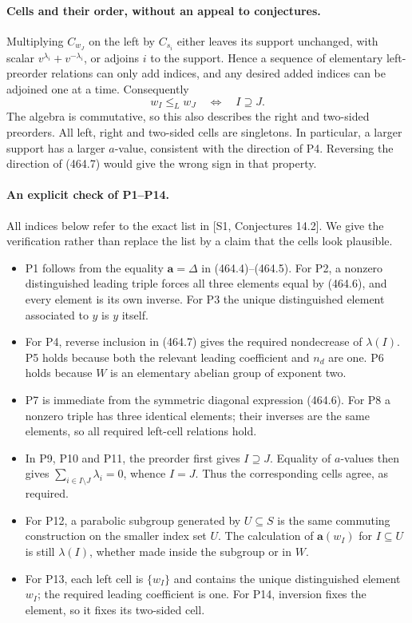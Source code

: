 \documentclass[11pt]{article}
\begin{document}
\paragraph{Cells and their order, without an appeal to conjectures.}
Multiplying $C_{w_J}$ on the left by $C_{s_i}$ either leaves its support
unchanged, with scalar $v^{\lambda_i}+v^{-\lambda_i}$, or adjoins
$i$ to the support. Hence a sequence of elementary left-preorder
relations can only add indices, and any desired added indices can
be adjoined one at a time. Consequently
\[
 w_I\leq_L w_J\quad\Longleftrightarrow\quad I\supseteq J.
 \tag{464.7}
\]
The algebra is commutative, so this also describes the right and
two-sided preorders. All left, right and two-sided cells are singletons.
In particular, a larger support has a larger $a$-value, consistent
with the direction of P4. Reversing the direction of (464.7) would
give the wrong sign in that property.

\paragraph{An explicit check of P1--P14.}
All indices below refer to the exact list in [S1, Conjectures 14.2].
We give the verification rather than replace the list by a claim that
the cells look plausible.

\begin{itemize}
\item P1 follows from the equality $\mathbf a=\Delta$ in (464.4)--(464.5).
For P2, a nonzero distinguished leading triple forces all three
elements equal by (464.6), and every element is its own inverse.
For P3 the unique distinguished element associated to $y$ is $y$ itself.
\item For P4, reverse inclusion in (464.7) gives the required
nondecrease of $\lambda(I)$. P5 holds because both the relevant
leading coefficient and $n_d$ are one. P6 holds because $W$ is an
elementary abelian group of exponent two.
\item P7 is immediate from the symmetric diagonal expression (464.6).
For P8 a nonzero triple has three identical elements; their inverses
are the same elements, so all required left-cell relations hold.
\item In P9, P10 and P11, the preorder first gives $I\supseteq J$.
Equality of $a$-values then gives
$\sum_{i\in I\setminus J}\lambda_i=0$, whence $I=J$.
Thus the corresponding cells agree, as required.
\item For P12, a parabolic subgroup generated by $U\subseteq S$
is the same commuting construction on the smaller index set $U$.
The calculation of $\mathbf a(w_I)$ for $I\subseteq U$ is still
$\lambda(I)$, whether made inside the subgroup or in $W$.
\item For P13, each left cell is $\{w_I\}$ and contains the unique
distinguished element $w_I$; the required leading coefficient is one.
For P14, inversion fixes the element, so it fixes its two-sided cell.
\end{itemize}
\end{document}
